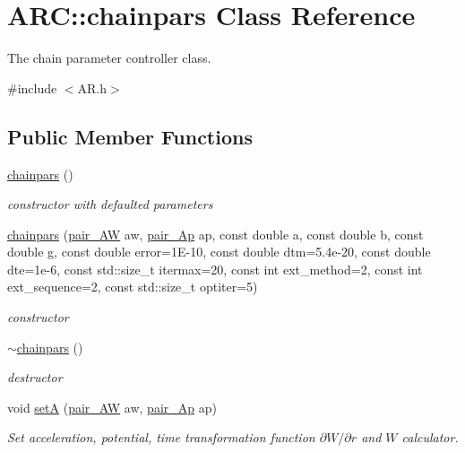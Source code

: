 \hypertarget{classARC_1_1chainpars}{}\section{A\+RC\+:\+:chainpars Class Reference}
\label{classARC_1_1chainpars}


The chain parameter controller class.  




{\ttfamily \#include $<$A\+R.\+h$>$}

\subsection*{Public Member Functions}
\begin{DoxyCompactItemize}
\item 
\hyperlink{classARC_1_1chainpars_a2019a609d85e2b801f306ac8c7f268ab}{chainpars} ()
\begin{DoxyCompactList}\small\item\em constructor with defaulted parameters \end{DoxyCompactList}\item 
\hyperlink{classARC_1_1chainpars_a91f5e98d8c936357b88a85e91924d2a2}{chainpars} (\hyperlink{namespaceARC_a5c4308ca4a8d0e0ff59fdce30f00274c}{pair\+\_\+\+AW} aw, \hyperlink{namespaceARC_a819446c4644b3a3af7ef11574d0b55e0}{pair\+\_\+\+Ap} ap, const double a, const double b, const double g, const double error=1\+E-\/10, const double dtm=5.\+4e-\/20, const double dte=1e-\/6, const std\+::size\+\_\+t itermax=20, const int ext\+\_\+method=2, const int ext\+\_\+sequence=2, const std\+::size\+\_\+t optiter=5)
\begin{DoxyCompactList}\small\item\em constructor \end{DoxyCompactList}\item 
\hyperlink{classARC_1_1chainpars_a032873f782645efb6e60dc77f6d425dc}{$\sim$chainpars} ()
\begin{DoxyCompactList}\small\item\em destructor \end{DoxyCompactList}\item 
void \hyperlink{classARC_1_1chainpars_af639f7bc8cfbb2a0330f079df2fd556e}{setA} (\hyperlink{namespaceARC_a5c4308ca4a8d0e0ff59fdce30f00274c}{pair\+\_\+\+AW} aw, \hyperlink{namespaceARC_a819446c4644b3a3af7ef11574d0b55e0}{pair\+\_\+\+Ap} ap)
\begin{DoxyCompactList}\small\item\em Set acceleration, potential, time transformation function $\partial W/\partial r$ and $W$ calculator. \end{DoxyCompactList}\item 

\end{DoxyCompactItemize}
